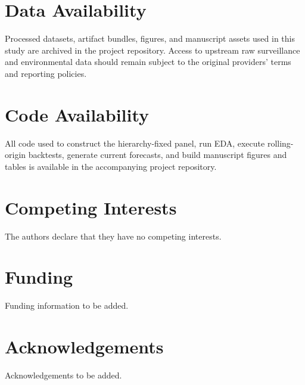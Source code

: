 \documentclass[11pt]{article}
\begin{document}
\section*{Data Availability}
Processed datasets, artifact bundles, figures, and manuscript assets used in this study are archived in the project repository. Access to upstream raw surveillance and environmental data should remain subject to the original providers' terms and reporting policies.

\section*{Code Availability}
All code used to construct the hierarchy-fixed panel, run EDA, execute rolling-origin backtests, generate current forecasts, and build manuscript figures and tables is available in the accompanying project repository.

\section*{Competing Interests}
The authors declare that they have no competing interests.

\section*{Funding}
Funding information to be added.

\section*{Acknowledgements}
Acknowledgements to be added.




\end{document}
